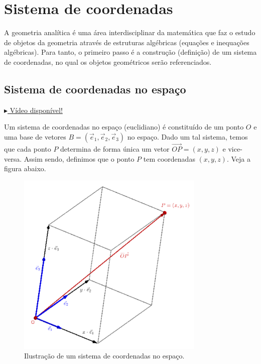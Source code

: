 
\chapter{Sistema de coordenadas}\label{cap_scoord}
\thispagestyle{fancy}

A geometria analítica é uma área interdisciplinar da matemática que faz o estudo de objetos da geometria através de estruturas algébricas (equações e inequações algébricas). Para tanto, o primeiro passo é a construção (definição) de um sistema de coordenadas, no qual os objetos geométricos serão referenciados.

\section{Sistema de coordenadas no espaço}\label{cap_scoord_sec_scoord}

\begin{flushright}
  \href{https://archive.org/details/sistema-de-coordenadas-tridimensional}{$\blacktriangleright$ Vídeo disponível!}
\end{flushright}

Um sistema de coordenadas no espaço (euclidiano) é constituído de um ponto $O$ e uma base de vetores $B = (\vec{e}_1, \vec{e}_2, \vec{e}_3)$ no espaço. Dado um tal sistema, temos que cada ponto $P$ determina de forma única um vetor $\overrightarrow{OP} = (x,y,z)$ e vice-versa. Assim sendo, definimos que o ponto $P$ tem coordenadas $(x,y,z)$. Veja a figura abaixo.

\begin{figure}[H]
  \centering
  \includegraphics[width=0.8\textwidth]{cap_scoord/dados/fig_scoord/fig}
  \caption{Ilustração de um sistema de coordenadas no espaço.}
  \label{fig:scoord}
\end{figure}

